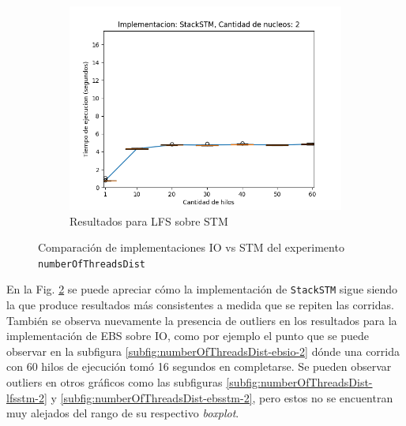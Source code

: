 \begin{figure}[t]
\begin{subfigure}[b]{0.49\textwidth}
    \end{subfigure}
    \begin{subfigure}[b]{0.49\textwidth}
        \includegraphics[width=\textwidth]{images/numberOfThreadsDist/plots/expStackSTM-2}
        \caption{Resultados para LFS sobre STM}
        \label{subfig:numberOfThreadsDist-stackstm-2}
    \end{subfigure}
    \caption{Comparación de implementaciones IO vs STM del experimento \texttt{numberOfThreadsDist}}
    \label{fig:numberOfThreadsDist-boxplots}
\end{figure}

En la Fig. \ref{fig:numberOfThreadsDist-boxplots} se puede apreciar cómo la implementación de \texttt{StackSTM} sigue siendo la que produce resultados más consistentes a medida que se repiten las corridas.
También se observa nuevamente la presencia de outliers en los resultados para la implementación de EBS sobre IO, como por ejemplo el punto que se puede observar en la subfigura \ref{subfig:numberOfThreadsDist-ebsio-2} dónde una corrida con 60 hilos de ejecución tomó 16 segundos en completarse.
Se pueden observar outliers en otros gráficos como las subfiguras \ref{subfig:numberOfThreadsDist-lfsstm-2} y \ref{subfig:numberOfThreadsDist-ebsstm-2}, pero estos no se encuentran muy alejados del rango de su respectivo \emph{boxplot}.
